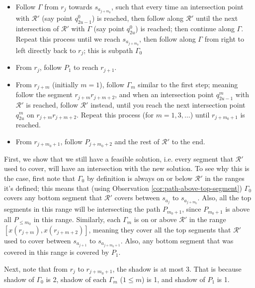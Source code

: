 \documentclass[10pt,a4paper]{amsart}
\theoremstyle{thmstyleone}
\begin{document}
    \label{alg:zig-zag-path}
    \begin{itemize}
        \item Follow $\Gamma$ from $r_{j}$ towards $s_{a_{j+m_0}}$, such that every time an intersection point with $\mathcal R'$ (say point $q^0_{2u - 1}$) is reached, then follow along $\mathcal R'$ until the next intersection of $\mathcal R'$ with $\Gamma$ (say point $q^0_{2u}$) is reached; then continue along $\Gamma$. Repeat this process until we reach $s_{a_{j+m_0}}$, then follow along $\Gamma$ from right to left directly back to $r_{j}$; this is subpath $\Gamma_0$

	    \item From $r_{j}$, follow $P_1$ to reach $r_{j + 1}$.
	    
	    \item From $r_{j + m}$ (initially $m = 1$), follow $\Gamma_m$ similar to the first step; meaning follow the segment $r_{j + m}\left. r_{j + m + 2}\right.$, and when an intersection point $q^m_{2u - 1}$ with $\mathcal R'$ is reached, follow $\mathcal R'$ instead, until you reach the next intersection point $q^m_{2u}$ on $r_{j+m}r_{j+m+2}$. Repeat this process (for $m = 1, 3, \dots$) until $r_{j + m_0 + 1}$ is reached. 
	    \item From $r_{j + m_0 + 1}$, follow $P_{j+m_0+2}$ and the rest of $\mathcal R'$ to the end.
	\end{itemize}
        First, we show that we still have a feasible solution, i.e.
        every segment that $\mathcal R'$ used to cover, will have an intersection with the new solution. To see why this is the case, first note that $\Gamma_0$ by definition is always on or below $\mathcal R'$ in the ranges it's defined; this means that (using Observation \ref{cor:path-above-top-segment}) $\Gamma_0$ covers any bottom segment that $\mathcal R'$ covers between $s_{a_{j}}$ to $s_{a_{j+m_0}}$. Also, all the top segments in this range  will be intersecting the path $P_{m_0+1}$, since $P_{m_0+1}$ is above all $P_{\leq m_0}$ in this range.
        Similarly, each $\Gamma_m$ is on or above $\mathcal R'$ in the range $[x(r_{j+m}),x(r_{j+m+2})]$, meaning they cover all the top segments that $\mathcal R'$ used to cover between $s_{a_{j+1}}$ to $s_{a_{j+m_0+1}}$. Also, any bottom segment that was covered in this range is covered by $P_1$. 

		Next, note that from $r_{j}$ to $r_{j+m_0+1}$, the shadow is at most 3. That is because shadow of $\Gamma_0$ is 2, shadow of each $\Gamma_m$ ($1\leq m$) is 1, and shadow of $P_1$ is 1.
\end{document}
